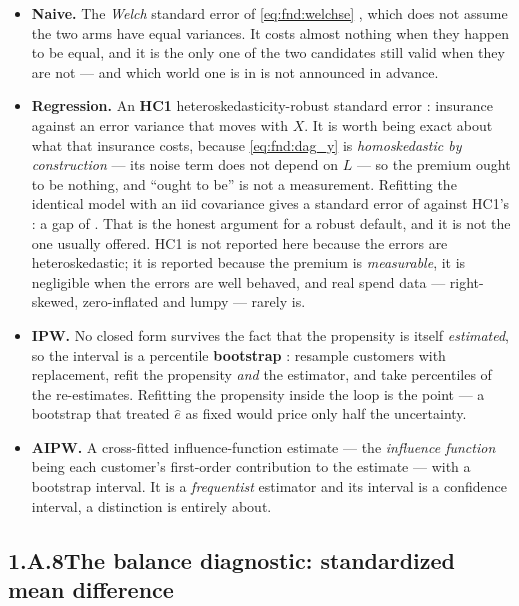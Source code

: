 \begin{itemize}[leftmargin=*]
  \item \textbf{Naive.} The \emph{Welch} standard error of \cref{eq:fnd:welchse}
        \citep{welch1947}, which does not assume the two arms have equal variances. It costs
        almost nothing when they happen to be equal, and it is the only one of the two
        candidates still valid when they are not --- and which world one is in is not announced
        in advance.
  \item \textbf{Regression.} An \textbf{HC1} heteroskedasticity-robust standard error
        \citep{white1980}: insurance against an error variance that moves with $X$. It is worth
        being exact about what that insurance costs, because \cref{eq:fnd:dag_y} is
        \emph{homoskedastic by construction} --- its noise term does not depend on $L$ --- so the
        premium ought to be nothing, and ``ought to be'' is not a measurement. Refitting the
        identical model with an iid covariance gives a standard error of \eur{\nbZeroOlsSeIid}
        against HC1's \eur{\nbZeroOlsSeHc}: a gap of \pc{\nbZeroOlsSeGapPct}. That is the honest
        argument for a robust default, and it is not the one usually offered. HC1 is not reported
        here because the errors are heteroskedastic; it is reported because the premium is
        \emph{measurable}, it is negligible when the errors are well behaved, and real spend data
        --- right-skewed, zero-inflated and lumpy --- rarely is.
  \item \textbf{IPW.} No closed form survives the fact that the propensity is itself
        \emph{estimated}, so the interval is a percentile \textbf{bootstrap}
        \citep{efron1979, efron1993}: resample customers with replacement, refit the propensity
        \emph{and} the estimator, and take percentiles of the re-estimates. Refitting the
        propensity inside the loop is the point --- a bootstrap that treated $\hat e$ as fixed
        would price only half the uncertainty.
  \item \textbf{AIPW.} A cross-fitted influence-function estimate --- the \emph{influence
        function} being each customer's first-order contribution to the estimate --- with a
        bootstrap interval. It is a \emph{frequentist} estimator and its interval is a confidence
        interval, a distinction  is entirely about.
\end{itemize}

\subsection*{1.A.8\quad The balance diagnostic: standardized mean difference}

